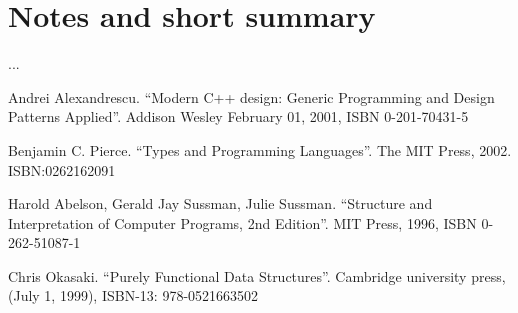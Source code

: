 \documentclass{article}
\begin{document}
\section{Notes and short summary}
...


\begin{thebibliography}{99}

Andrei Alexandrescu. ``Modern C++ design: Generic Programming and Design Patterns Applied''. Addison Wesley February 01, 2001, ISBN 0-201-70431-5

Benjamin C. Pierce. ``Types and Programming Languages''. The MIT Press, 2002. ISBN:0262162091

Harold Abelson, Gerald Jay Sussman, Julie Sussman. ``Structure and Interpretation of Computer Programs, 2nd Edition''. MIT Press, 1996, ISBN 0-262-51087-1

Chris Okasaki. ``Purely Functional Data Structures''. Cambridge university press, (July 1, 1999), ISBN-13: 978-0521663502

\end{thebibliography}

\ifx\wholebook\relax \else
\end{document}
